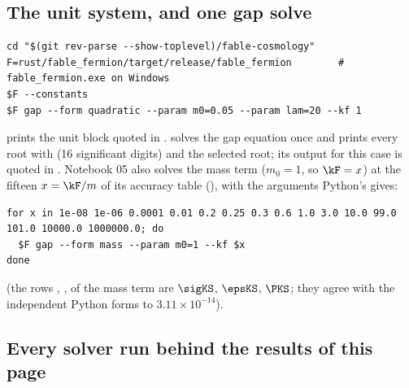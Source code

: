 \subsection{The unit system, and one gap solve}
\label{sec:11.3}

\begin{Verbatim}
cd "$(git rev-parse --show-toplevel)/fable-cosmology"
F=rust/fable_fermion/target/release/fable_fermion        # fable_fermion.exe on Windows
$F --constants
$F gap --form quadratic --param m0=0.05 --param lam=20 --kf 1
\end{Verbatim}
 prints the unit block quoted in .  solves the gap equation once
and prints every root with  (16 significant digits) and
the selected root; its output for this case is quoted in . Notebook 05 also solves the mass term
($m_0=1$, so $\kF=x$) at the fifteen $x=\kF/m$ of its accuracy table (), with the arguments
Python's  gives:
\begin{Verbatim}
for x in 1e-08 1e-06 0.0001 0.01 0.2 0.25 0.3 0.6 1.0 3.0 10.0 99.0 101.0 10000.0 1000000.0; do
  $F gap --form mass --param m0=1 --kf $x
done
\end{Verbatim}
(the rows , ,  of the mass term are $\sigKS$, $\epsKS$, $\PKS$; they
agree with the independent Python forms to $3.11\times10^{-14}$).

\subsection{Every solver run behind the results of this page}
\label{sec:11.4}

